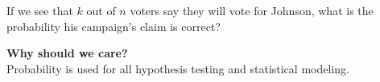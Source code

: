 \documentclass[aspectratio=169]{beamer}
\theoremstyle{principle}
\begin{document}
\begin{frame}


\begin{center}
\huge If we see that $k$ out of $n$ voters say they will vote for Johnson, what is the probability his campaign's claim is correct?
\end{center}

\end{frame}

\begin{frame}

\begin{center}
\Huge\textbf{Why should we care?}\\
\bigskip
\bigskip
\large Probability is used for all hypothesis testing and statistical modeling.\\
\end{center}

\end{frame}
\end{document}
